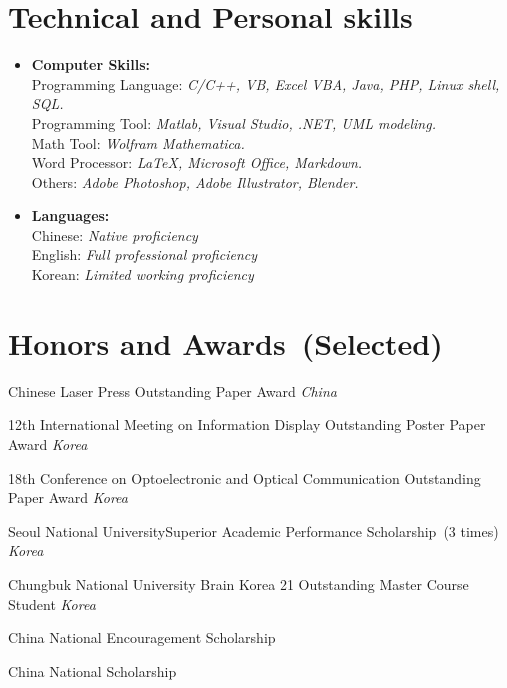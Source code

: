 \documentclass[10pt,a4paper]{moderncv}
\begin{document}
\section{Technical and Personal skills}
\begin{itemize}
	\item \textbf{Computer Skills:}
	\\Programming Language: {\em C/C++, VB, Excel VBA, Java, PHP, Linux shell, SQL.}
	\\Programming Tool: {\em Matlab, Visual Studio, .NET, UML modeling.}
	\\Math Tool: {\em Wolfram Mathematica.}
	\\Word Processor: {\em \LaTeX, Microsoft Office, Markdown.}
	\\Others: {\em Adobe Photoshop, Adobe Illustrator, Blender.}

	\item \textbf{Languages:}
	\\Chinese: {\em Native proficiency}
	\\English: {\em Full professional proficiency}
	\\Korean: {\em Limited working proficiency}
\end{itemize}

\section{Honors and Awards~(Selected)}
\vspace{3pt}
{Chinese Laser Press}
{Outstanding Paper Award}
{}{\textit{China}}{}


{12th International Meeting on Information Display}
{Outstanding Poster Paper Award}
{}{\textit{Korea}}{}

{18th Conference on Optoelectronic and Optical Communication}
{Outstanding Paper Award}
{}{\textit{Korea}}{}

{Seoul National University}{Superior Academic Performance Scholarship~(3 times)}
{}{\textit{Korea}}{}

{Chungbuk National University}
{Brain Korea 21 Outstanding Master Course Student}
{}{\textit{Korea}}{}

{China}
{National Encouragement Scholarship}
{}{}{}

{China}
{National Scholarship}
{}{}{}
\end{document}

